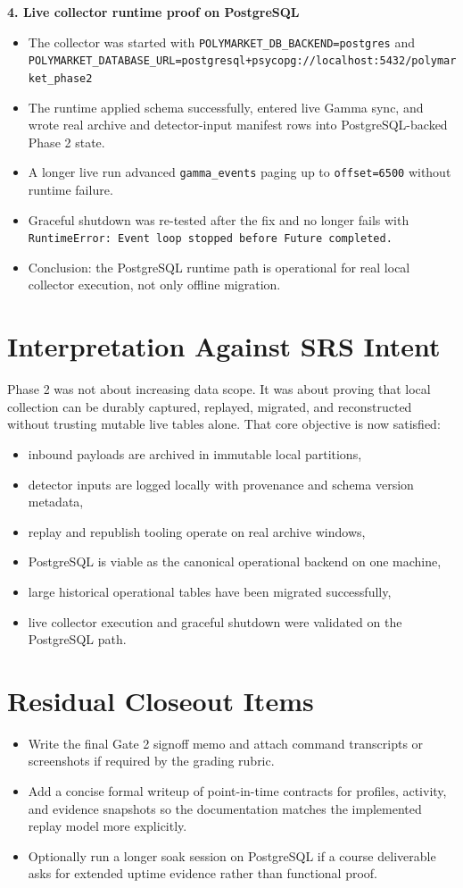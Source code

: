 \documentclass{article}
\begin{document}
\textbf{4. Live collector runtime proof on PostgreSQL}
\begin{itemize}
\item The collector was started with \texttt{POLYMARKET\_DB\_BACKEND=postgres} and \texttt{POLYMARKET\_DATABASE\_URL=postgresql+psycopg://localhost:5432/polymarket\_phase2}
\item The runtime applied schema successfully, entered live Gamma sync, and wrote real archive and detector-input manifest rows into PostgreSQL-backed Phase 2 state.
\item A longer live run advanced \texttt{gamma\_events} paging up to \texttt{offset=6500} without runtime failure.
\item Graceful shutdown was re-tested after the fix and no longer fails with \texttt{RuntimeError: Event loop stopped before Future completed.}
\item Conclusion: the PostgreSQL runtime path is operational for real local collector execution, not only offline migration.
\end{itemize}

\section*{Interpretation Against SRS Intent}
Phase 2 was not about increasing data scope. It was about proving that local collection can be durably captured, replayed, migrated, and reconstructed without trusting mutable live tables alone. That core objective is now satisfied:
\begin{itemize}
\item inbound payloads are archived in immutable local partitions,
\item detector inputs are logged locally with provenance and schema version metadata,
\item replay and republish tooling operate on real archive windows,
\item PostgreSQL is viable as the canonical operational backend on one machine,
\item large historical operational tables have been migrated successfully,
\item live collector execution and graceful shutdown were validated on the PostgreSQL path.
\end{itemize}

\section*{Residual Closeout Items}
\begin{itemize}
\item Write the final Gate 2 signoff memo and attach command transcripts or screenshots if required by the grading rubric.
\item Add a concise formal writeup of point-in-time contracts for profiles, activity, and evidence snapshots so the documentation matches the implemented replay model more explicitly.
\item Optionally run a longer soak session on PostgreSQL if a course deliverable asks for extended uptime evidence rather than functional proof.
\end{itemize}
\end{document}
